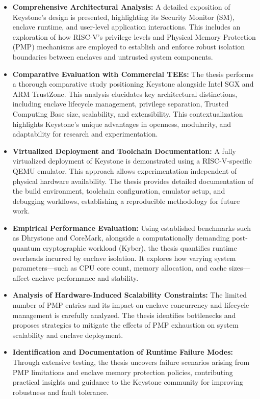 \begin{itemize}
    \item \textbf{Comprehensive Architectural Analysis:} A detailed exposition of Keystone’s design is presented, highlighting its Security Monitor (SM), enclave runtime, and user-level application interactions. This includes an exploration of how RISC-V’s privilege levels and Physical Memory Protection (PMP) mechanisms are employed to establish and enforce robust isolation boundaries between enclaves and untrusted system components.
    
    \item \textbf{Comparative Evaluation with Commercial TEEs:} The thesis performs a thorough comparative study positioning Keystone alongside Intel SGX and ARM TrustZone. This analysis elucidates key architectural distinctions, including enclave lifecycle management, privilege separation, Trusted Computing Base size, scalability, and extensibility. This contextualization highlights Keystone’s unique advantages in openness, modularity, and adaptability for research and experimentation.
    
    \item \textbf{Virtualized Deployment and Toolchain Documentation:} A fully virtualized deployment of Keystone is demonstrated using a RISC-V-specific QEMU emulator. This approach allows experimentation independent of physical hardware availability. The thesis provides detailed documentation of the build environment, toolchain configuration, emulator setup, and debugging workflows, establishing a reproducible methodology for future work.
    
    \item \textbf{Empirical Performance Evaluation:} Using established benchmarks such as Dhrystone and CoreMark, alongside a computationally demanding post-quantum cryptographic workload (Kyber), the thesis quantifies runtime overheads incurred by enclave isolation. It explores how varying system parameters—such as CPU core count, memory allocation, and cache sizes—affect enclave performance and stability.
    
    \item \textbf{Analysis of Hardware-Induced Scalability Constraints:} The limited number of PMP entries and its impact on enclave concurrency and lifecycle management is carefully analyzed. The thesis identifies bottlenecks and proposes strategies to mitigate the effects of PMP exhaustion on system scalability and enclave deployment.
    
    \item \textbf{Identification and Documentation of Runtime Failure Modes:} Through extensive testing, the thesis uncovers failure scenarios arising from PMP limitations and enclave memory protection policies, contributing practical insights and guidance to the Keystone community for improving robustness and fault tolerance.
\end{itemize}

